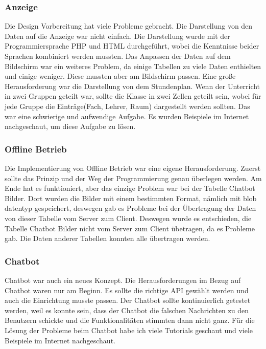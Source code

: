\subsubsection{Anzeige}
Die Design Vorbereitung hat viele Probleme gebracht. Die Darstellung von den Daten auf die Anzeige war nicht einfach. Die Darstellung wurde mit der Programmiersprache PHP und HTML durchgeführt, wobei die Kenntnisse beider Sprachen kombiniert werden mussten. Das Anpassen der Daten auf dem Bildschirm war ein weiteres Problem, da einige Tabellen zu viele Daten enthielten und einige weniger. Diese mussten aber am Bildschirm passen. Eine gro\ss{}e Herausforderung war die Darstellung von dem Stundenplan. Wenn der Unterricht in zwei Gruppen geteilt war, sollte die Klasse in zwei Zellen geteilt sein, wobei f\"ur jede Gruppe die Eintr\"age(Fach, Lehrer, Raum) dargestellt werden sollten. Das war eine schwierige und aufwendige Aufgabe. Es wurden Beispiele im Internet nachgeschaut, um diese Aufgabe zu l\"osen.

\subsubsection{Offline Betrieb}
Die Implementierung von Offline Betrieb war eine eigene Herausforderung. Zuerst sollte das Prinzip und der Weg der Programmierung genau \"uberlegen werden. Am Ende hat es funktioniert, aber das einzige Problem war bei der Tabelle Chatbot Bilder. Dort wurden die Bilder mit einem bestimmten Format, n\"amlich mit blob datentyp gespeichert, deswegen gab es Probleme bei der \"Ubertragung der Daten von dieser Tabelle vom Server zum Client.  Deswegen wurde es entschieden, die Tabelle Chatbot Bilder nicht vom Server zum Client \"ubetragen, da es Probleme gab. Die Daten anderer Tabellen konnten alle \"ubertragen werden.

\subsubsection{Chatbot}

Chatbot war auch ein neues Konzept. Die Herausforderungen im Bezug auf Chatbot waren nur am Beginn. Es sollte die richtige API gewählt werden und auch die Einrichtung musste passen. Der Chatbot sollte kontinuierlich getestet werden, weil es konnte sein, dass der Chatbot die falschen Nachrichten zu den Benutzern schickte und die Funktionalit\"aten stimmten dann nicht ganz. F\"ur die L\"osung der Probleme beim Chatbot habe ich viele Tutorials geschaut und viele Beispiele im Internet nachgeschaut. 

